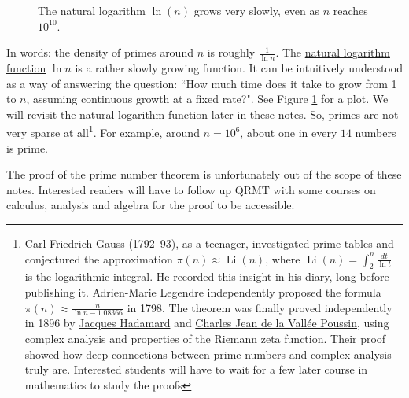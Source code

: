 \begin{figure}[h]
\centering
{}
\caption{The natural logarithm $\ln(n)$ grows very slowly, even as $n$ reaches $10^{10}$.}
\label{fig:lnn}
\end{figure}


In words: the density of primes around $n$ is roughly $\tfrac{1}{\ln n}$.  The \href{https://en.wikipedia.org/wiki/Natural\_logarithm}{natural logarithm function} $\ln n$ is a rather slowly growing function. It can be intuitively understood as a way of answering the question: ``How much time does it take to grow from 1 to $n$, assuming continuous growth at a fixed rate?". See Figure \ref{fig:lnn} for a plot. We will revisit the natural logarithm function later in these notes. So, primes are not very sparse at all\footnote{Carl Friedrich Gauss (1792–93), as a teenager, investigated prime tables and conjectured the approximation $\pi(n) \approx \operatorname{Li}(n)$, where $\operatorname{Li}(n) = \int_2^n \tfrac{dt}{\ln t}$ is the logarithmic integral.  He recorded this insight in his diary, long before publishing it. Adrien-Marie Legendre independently proposed the formula $\pi(n)\approx \tfrac{n}{\ln n - 1.08366}$ in 1798. The theorem was finally proved independently in 1896 by \href{https://en.wikipedia.org/wiki/Jacques\_Hadamard}{Jacques Hadamard}  and \href{https://en.wikipedia.org/wiki/Charles\_Jean\_de\_la\_Vall\%C3\%A9e\_Poussin}{Charles Jean de la Vall\'ee Poussin}, using complex analysis and properties of the Riemann zeta function.   Their proof showed how deep connections between prime numbers and complex analysis truly are. Interested students will have to wait for a few later course in mathematics to study the proofs}.
For example, around $n=10^6$, about one in every $14$ numbers is prime.

The proof of the prime number theorem is unfortunately out of the scope of these notes. Interested readers will have to follow up QRMT with some courses on calculus, analysis and algebra for the proof to be accessible.

